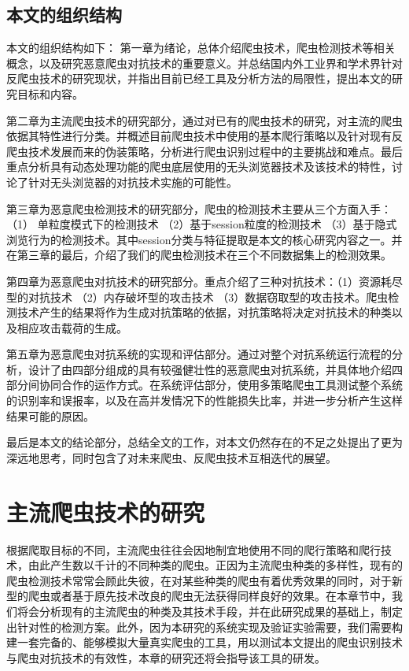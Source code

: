 \documentclass[doctor,privacy,twoside]{buaa_mac}
\begin{document}
\section{本文的组织结构}
本文的组织结构如下：
第一章为绪论，总体介绍爬虫技术，爬虫检测技术等相关概念，以及研究恶意爬虫对抗技术的重要意义。并总结国内外工业界和学术界针对反爬虫技术的研究现状，并指出目前已经工具及分析方法的局限性，提出本文的研究目标和内容。


第二章为主流爬虫技术的研究部分，通过对已有的爬虫技术的研究，对主流的爬虫依据其特性进行分类。并概述目前爬虫技术中使用的基本爬行策略以及针对现有反爬虫技术发展而来的伪装策略，分析进行爬虫识别过程中的主要挑战和难点。最后重点分析具有动态处理功能的爬虫底层使用的无头浏览器技术及该技术的特性，讨论了针对无头浏览器的对抗技术实施的可能性。

第三章为恶意爬虫检测技术的研究部分，爬虫的检测技术主要从三个方面入手：（1） 单粒度模式下的检测技术 （2）基于session粒度的检测技术  （3）基于隐式浏览行为的检测技术。其中session分类与特征提取是本文的核心研究内容之一。并在第三章的最后，介绍了我们的爬虫检测技术在三个不同数据集上的检测效果。

第四章为恶意爬虫对抗技术的研究部分。重点介绍了三种对抗技术：（1）资源耗尽型的对抗技术 （2）内存破坏型的攻击技术 （3）数据窃取型的攻击技术。爬虫检测技术产生的结果将作为生成对抗策略的依据，对抗策略将决定对抗技术的种类以及相应攻击载荷的生成。

第五章为恶意爬虫对抗系统的实现和评估部分。通过对整个对抗系统运行流程的分析，设计了由四部分组成的具有较强健壮性的恶意爬虫对抗系统，并具体地介绍四部分间协同合作的运作方式。在系统评估部分，使用多策略爬虫工具测试整个系统的识别率和误报率，以及在高并发情况下的性能损失比率，并进一步分析产生这样结果可能的原因。

最后是本文的结论部分，总结全文的工作，对本文仍然存在的不足之处提出了更为深远地思考，同时包含了对未来爬虫、反爬虫技术互相迭代的展望。






\chapter{主流爬虫技术的研究}

根据爬取目标的不同，主流爬虫往往会因地制宜地使用不同的爬行策略和爬行技术，由此产生数以千计的不同种类的爬虫。正因为主流爬虫种类的多样性，现有的爬虫检测技术常常会顾此失彼，在对某些种类的爬虫有着优秀效果的同时，对于新型的爬虫或者基于原先技术改良的爬虫无法获得同样良好的效果。在本章节中，我们将会分析现有的主流爬虫的种类及其技术手段，并在此研究成果的基础上，制定出针对性的检测方案。此外，因为本研究的系统实现及验证实验需要，我们需要构建一套完备的、能够模拟大量真实爬虫的工具，用以测试本文提出的爬虫识别技术与爬虫对抗技术的有效性，本章的研究还将会指导该工具的研发。
\end{document}
